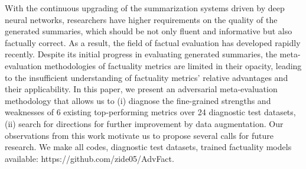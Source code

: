 With the continuous upgrading of the summarization systems driven by deep neural networks, researchers have higher requirements on the quality of the generated summaries, which should be not only fluent and informative but also factually correct. As a result, the field of factual evaluation has developed rapidly recently. Despite its initial progress in evaluating generated summaries, the meta-evaluation methodologies of factuality metrics are limited in their opacity, leading to the insufficient understanding of factuality metrics' relative advantages and their applicability. In this paper, we present an adversarial meta-evaluation methodology that allows us to (i) diagnose the fine-grained strengths and weaknesses of 6 existing top-performing metrics over 24 diagnostic test datasets, (ii) search for directions for further improvement by data augmentation. Our observations from this work motivate us to propose several calls for future research. We make all codes, diagnostic test datasets, trained factuality models available: https://github.com/zide05/AdvFact.
